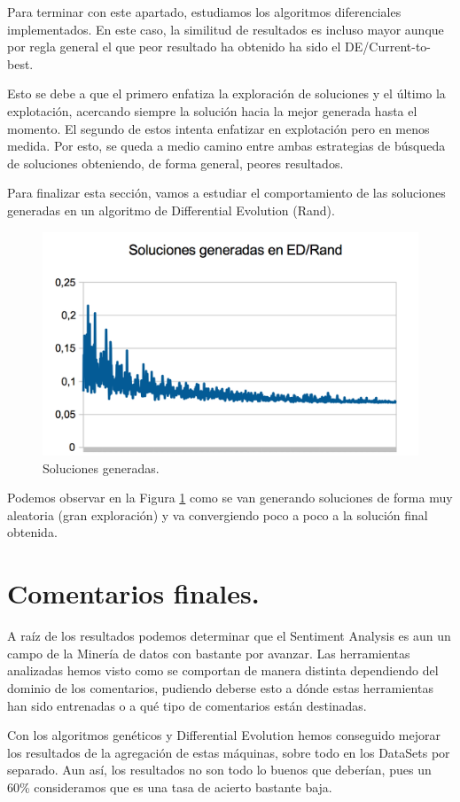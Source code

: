 \documentclass{article}
\begin{document}
	Para terminar con este apartado, estudiamos los algoritmos diferenciales implementados.  En este caso, la similitud de resultados es incluso mayor aunque por regla general el que peor resultado ha obtenido ha sido el DE/Current-to-best. 
	
	Esto se debe a que el primero enfatiza la exploración de soluciones y el último la explotación, acercando siempre la solución hacia la mejor generada hasta el momento. El segundo de estos intenta enfatizar en explotación pero en menos medida. Por esto, se queda a medio camino entre ambas estrategias de búsqueda de soluciones obteniendo, de forma general, peores resultados.
	
	Para finalizar esta sección, vamos a estudiar el comportamiento de las soluciones generadas en un algoritmo de Differential Evolution (Rand). 
	
	\begin{figure}[H]
		\centering
		\includegraphics[width=0.7\linewidth]{rand}
		\caption{Soluciones generadas.}
		\label{fig:rand}
	\end{figure}
	

	Podemos observar en la Figura \ref{fig:rand} como se van generando soluciones de forma muy aleatoria (gran exploración) y va convergiendo poco a poco a la solución final obtenida.
	
	

\section{Comentarios finales.}
A raíz de los resultados podemos determinar que el Sentiment Analysis es aun un campo de la Minería de datos con bastante por avanzar. Las herramientas analizadas hemos visto como se comportan de manera distinta dependiendo del dominio de los comentarios, pudiendo deberse esto a dónde estas herramientas han sido entrenadas o a qué tipo de comentarios están destinadas.

Con los algoritmos genéticos y Differential Evolution hemos conseguido mejorar los resultados de la agregación de estas máquinas, sobre todo en los DataSets por separado. Aun así, los resultados no son todo lo buenos que deberían, pues un 60\% consideramos que es una tasa de acierto bastante baja.
\end{document}
